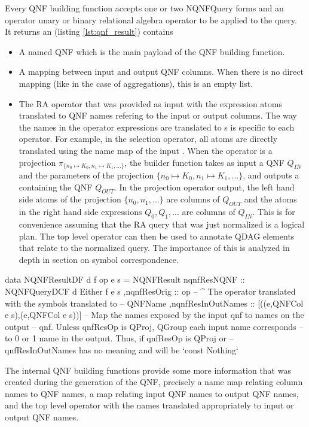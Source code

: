 Every QNF building function accepts one or two {NQNFQuery} forms and an
operator unary or binary relational algebra operator to be applied to the query.
It returns an  (listing \ref{lst:qnf_result}) contains

\begin{itemize}
\item A  named QNF which is the main payload of the QNF building function.
\item A mapping between input and output QNF columns. When there is no direct mapping
 (like in the case of aggregations), this is an empty list.
\item The RA operator that was provided as input with the expression atoms
  translated to QNF names
  refering to the input or output columns. The way the names in the operator expressions are translated to
  s is specific to each operator. For example,
  in the selection operator, all atoms are directly translated
  using the name map of the input . When the operator is a
  projection \(\pi_{\{n_0 \mapsto K_0, n_1 \mapsto K_1, ...\}}\), the
  builder function takes as input a QNF \(Q_{IN}\) and the parameters of the projection
  \(\{n_0 \mapsto K_0, n_1 \mapsto K_1, ...\}\), and outputs a  containing the
  QNF \(Q_{OUT}\).
  In the projection operator output, the left hand side atoms of the projection \(\{n_0, n_1, ...\}\) are
  columns of \(Q_{OUT}\) and the atoms in the right hand side expressions \(Q_0,Q_1,...\) are columns of \(Q_{IN}\).
  This is for convenience assuming that the RA
  query that was just normalized is a logical plan. The top level
  operator can then be used to annotate QDAG elements that relate to
  the normalized query. The importance of this is analyzed in depth in
  section \label{sel:symbol_correspondence} on symbol correspondence.

\end{itemize}

\begin{code}
  \begin{haskellcode}
    data NQNFResultDF d f op e s =
    NQNFResult
    { nqnfResNQNF :: NQNFQueryDCF d Either f e s
      ,nqnfResOrig :: op
      -- ^ The operator translated with the symbols translated to
      -- QNFName
      ,nqnfResInOutNames :: [((e,QNFCol e s),(e,QNFCol e s))]
      -- Map the names exposed by the input qnf to names on the output
      -- qnf. Unless qnfResOp is QProj, QGroup each input name corresponds
      -- to 0 or 1 name in the output. Thus, if qnfResOp is QProj or
      -- qnfResInOutNames has no meaning and will be `const Nothing`
    }
  \end{haskellcode}
  \caption{\label{lst:qnf_result}The internal QNF building functions
    provide some more information that was created during the
    generation of the QNF, precisely a name map relating column names
    to QNF names, a map relating input QNF names to output QNF names,
    and the top level operator with the names translated appropriately
    to input or output QNF names.}
\end{code}


